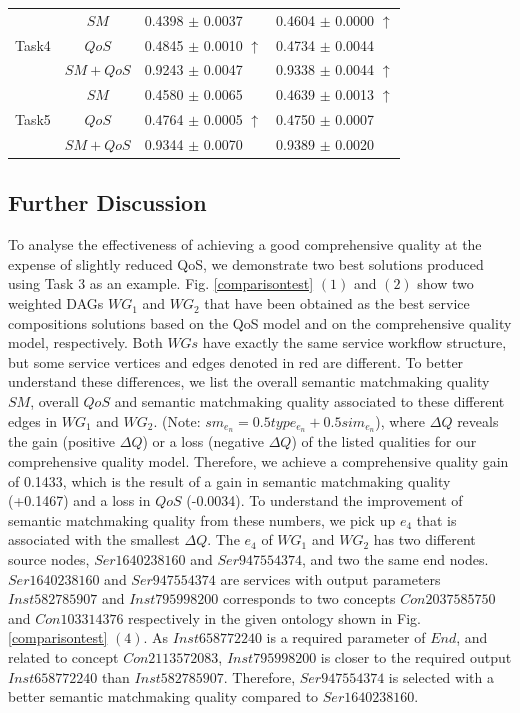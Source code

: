 \documentclass{llncs}
\begin{document}
\begin{table}[]
\begin{tabular}{c|c|l|l}
\multirow{3}{*}{Task4}  &$SM$      &0.4398 $\pm$ 0.0037               &0.4604 $\pm$ 0.0000 $\uparrow$ \\ \cline{2-4} 
                        &$QoS$     &0.4845 $\pm$ 0.0010 $\uparrow$    &0.4734 $\pm$ 0.0044            \\ \cline{2-4}
                        &$SM+QoS$  &0.9243 $\pm$ 0.0047               &0.9338 $\pm$ 0.0044 $\uparrow$           \\ \hline
\multirow{3}{*}{Task5}  &$SM$      &0.4580 $\pm$ 0.0065               &0.4639 $\pm$ 0.0013 $\uparrow$ \\ \cline{2-4} 
                        &$QoS$     &0.4764 $\pm$ 0.0005 $\uparrow$    &0.4750 $\pm$ 0.0007            \\ \cline{2-4}
                        &$SM+QoS$  &0.9344 $\pm$ 0.0070               &0.9389 $\pm$ 0.0020           \\ \hline
\end{tabular}
\end{table}
\vspace{-0.8cm}
\subsection{Further Discussion}\label{discuss1}
To analyse the effectiveness of achieving a good comprehensive quality at the expense of slightly reduced QoS, we demonstrate two best solutions produced using Task 3 as an example. Fig. \ref{comparisontest} $(1)$ and $(2)$ show two weighted DAGs $WG_1$ and $WG_2$ that have been obtained as the best service compositions solutions based on the QoS model and on the comprehensive quality model, respectively. Both $WGs$ have exactly the same service workflow structure, but some service vertices and edges denoted in red are different. To better understand these differences, we list the overall semantic matchmaking quality $SM$,  overall $QoS$ and semantic matchmaking quality associated to these different edges in $WG_1$ and $WG_2$. (Note: $sm_{e_n} = 0.5type_{e_n} + 0.5 sim_{e_n}$), where $\Delta Q$ reveals the gain (positive $\Delta Q$) or a loss (negative $\Delta Q$) of the listed qualities for our comprehensive quality model. Therefore, we achieve a comprehensive quality gain of 0.1433, which is the result of a gain in semantic matchmaking quality (+0.1467) and a loss in $QoS$ (-0.0034). To understand the improvement of semantic matchmaking quality from these numbers, we pick up $e_4$ that is associated with the smallest $\Delta Q$. The $e_4$ of $WG_1$ and $WG_2$ has two different source nodes, $Ser1640238160$ and $Ser947554374$, and two the same end nodes. $Ser1640238160$ and $Ser947554374$ are services with output parameters $Inst582785907$ and  $Inst795998200$ corresponds to two concepts $Con2037585750$ and $Con103314376$ respectively in the given ontology shown in Fig. \ref{comparisontest} $(4)$. As $Inst658772240$ is a required parameter of $End$, and related to concept $Con2113572083$, $Inst795998200$ is closer to the required output $Inst658772240$ than $Inst582785907$. Therefore,  $Ser947554374$ is selected with a better semantic matchmaking quality compared to $Ser1640238160$.
\vspace{-0.6cm}
\end{document}
